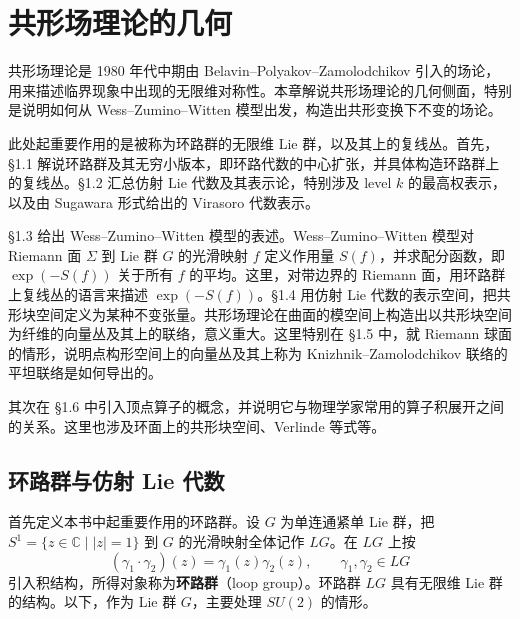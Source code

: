\chapter{共形场理论的几何}

共形场理论是 1980 年代中期由 Belavin--Polyakov--Zamolodchikov 引入的场论，用来描述临界现象中出现的无限维对称性。本章解说共形场理论的几何侧面，特别是说明如何从 Wess--Zumino--Witten 模型出发，构造出共形变换下不变的场论。

此处起重要作用的是被称为环路群的无限维 Lie 群，以及其上的复线丛。首先，§1.1 解说环路群及其无穷小版本，即环路代数的中心扩张，并具体构造环路群上的复线丛。§1.2 汇总仿射 Lie 代数及其表示论，特别涉及 level $k$ 的最高权表示，以及由 Sugawara 形式给出的 Virasoro 代数表示。

§1.3 给出 Wess--Zumino--Witten 模型的表述。Wess--Zumino--Witten 模型对 Riemann 面 $\Sigma$ 到 Lie 群 $G$ 的光滑映射 $f$ 定义作用量 $S(f)$，并求配分函数，即 $\exp(-S(f))$ 关于所有 $f$ 的平均。这里，对带边界的 Riemann 面，用环路群上复线丛的语言来描述 $\exp(-S(f))$。§1.4 用仿射 Lie 代数的表示空间，把共形块空间定义为某种不变张量。共形场理论在曲面的模空间上构造出以共形块空间为纤维的向量丛及其上的联络，意义重大。这里特别在 §1.5 中，就 Riemann 球面的情形，说明点构形空间上的向量丛及其上称为 Knizhnik--Zamolodchikov 联络的平坦联络是如何导出的。

其次在 §1.6 中引入顶点算子的概念，并说明它与物理学家常用的算子积展开之间的关系。这里也涉及环面上的共形块空间、Verlinde 等式等。


\section{环路群与仿射 Lie 代数}


首先定义本书中起重要作用的环路群。设 $G$ 为单连通紧单 Lie 群，把 $S^{1}=\{z\in\mathbb{C}\mid |z|=1\}$ 到 $G$ 的光滑映射全体记作 $LG$。在 $LG$ 上按
\[
  (\gamma_{1}\cdot\gamma_{2})(z)=\gamma_{1}(z)\gamma_{2}(z),\qquad \gamma_{1},\gamma_{2}\in LG
\]
引入积结构，所得对象称为\textbf{环路群}（loop group）。环路群 $LG$ 具有无限维 Lie 群的结构。以下，作为 Lie 群 $G$，主要处理 $SU(2)$ 的情形。

